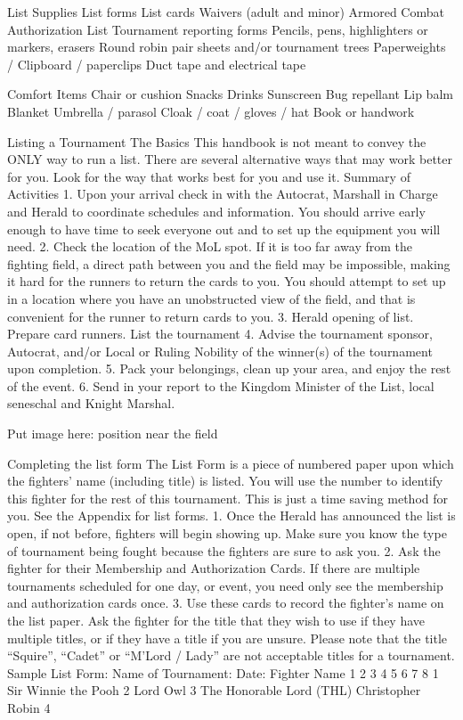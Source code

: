 \documentclass{article}
\begin{document}
List Supplies
List forms
List cards
Waivers (adult and minor)
Armored Combat Authorization List
Tournament reporting forms
Pencils, pens, highlighters or markers, erasers
Round robin pair sheets and/or tournament trees
Paperweights / Clipboard / paperclips
Duct tape and electrical tape


Comfort Items
Chair or cushion
Snacks
Drinks
Sunscreen
Bug repellant
Lip balm
Blanket
Umbrella / parasol
Cloak / coat / gloves / hat
Book or handwork


Listing a Tournament
The Basics
This handbook is not meant to convey the ONLY way to run a list. There are several alternative ways that
may work better for you. Look for the way that works best for you and use it.
Summary of Activities
1. Upon your arrival check in with the Autocrat, Marshall in Charge and Herald to coordinate
schedules and information. You should arrive early enough to have time to seek everyone out and to
set up the equipment you will need.
2. Check the location of the MoL spot. If it is too far away from the fighting field, a direct path
between you and the field may be impossible, making it hard for the runners to return the cards to
you. You should attempt to set up in a location where you have an unobstructed view of the field,
and that is convenient for the runner to return cards to you.
3. Herald opening of list. Prepare card runners. List the tournament
4. Advise the tournament sponsor, Autocrat, and/or Local or Ruling Nobility of the winner(s) of the
tournament upon completion.
5. Pack your belongings, clean up your area, and enjoy the rest of the event.
6. Send in your report to the Kingdom Minister of the List, local seneschal and Knight Marshal.



Put image here: position near the field



Completing the list form
The List Form is a piece of numbered paper upon which the fighters’ name (including title) is listed. You
will use the number to identify this fighter for the rest of this tournament. This is just a time saving
method for you. See the Appendix for list forms.
1. Once the Herald has announced the list is open, if not before, fighters will begin showing up. Make
sure you know the type of tournament being fought because the fighters are sure to ask you.
2. Ask the fighter for their Membership and Authorization Cards. If there are multiple tournaments
scheduled for one day, or event, you need only see the membership and authorization cards once.
3. Use these cards to record the fighter’s name on the list paper. Ask the fighter for the title that they
wish to use if they have multiple titles, or if they have a title if you are unsure. Please note that the title
“Squire”, “Cadet” or “M’Lord / Lady” are not acceptable titles for a tournament.
Sample List Form:
Name of Tournament: Date:
Fighter Name 1 2 3 4 5 6 7 8
1 Sir Winnie the Pooh
2 Lord Owl
3
The Honorable Lord (THL)
Christopher Robin
4
\end{document}
